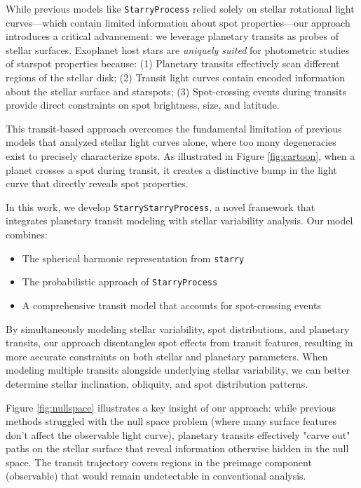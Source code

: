 \documentclass[twocolumn]{aastex631}
\begin{document}
While previous models like \texttt{StarryProcess} relied solely on stellar rotational light curves—which contain limited 
information about spot properties—our approach introduces a critical advancement: we leverage planetary transits as probes of 
stellar surfaces. Exoplanet host stars are \textit{uniquely suited} for photometric studies of starspot properties because:
(1) Planetary transits effectively scan different regions of the stellar disk;
(2) Transit light curves contain encoded information about the stellar surface and starspots;
(3) Spot-crossing events during transits provide direct constraints on spot brightness, size, and latitude.

This transit-based approach overcomes the fundamental limitation of previous models that analyzed stellar light curves alone, 
where too many degeneracies exist to precisely characterize spots. As illustrated in Figure \ref{fig:cartoon}, when a planet 
crosses a spot during transit, it creates a distinctive bump in the light curve that directly reveals spot properties.

In this work, we develop \texttt{StarryStarryProcess}, a novel framework that integrates planetary transit modeling with 
stellar variability analysis. Our model combines:
\begin{itemize}
    \item The spherical harmonic representation from \texttt{starry}
    \item The probabilistic approach of \texttt{StarryProcess}
    \item A comprehensive transit model that accounts for spot-crossing events
\end{itemize}

By simultaneously modeling stellar variability, spot distributions, and planetary transits, our approach disentangles 
spot effects from transit features, resulting in more accurate constraints on both stellar and planetary parameters. 
When modeling multiple transits alongside underlying stellar variability, we can better determine stellar inclination, 
obliquity, and spot distribution patterns.

Figure \ref{fig:nullspace} illustrates a key insight of our approach: while previous methods struggled with the null 
space problem (where many surface features don't affect the observable light curve), planetary transits effectively 
"carve out" paths on the stellar surface that reveal information otherwise hidden in the null space. The transit trajectory 
covers regions in the preimage component (observable) that would remain undetectable in conventional analysis.
\end{document}
